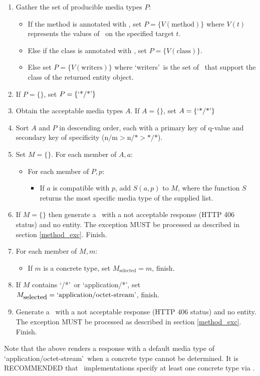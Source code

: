 \begin{enumerate}
\item Gather the set of producible media types $P$:
\begin{itemize}
\item If the method is annotated with \Produces, set $P = \{ V(\mbox{method}) \}$ where $V(t)$ represents the values of \Produces\ on the specified target $t$.
\item Else if the class is annotated with \Produces, set $P = \{ V(\mbox{class}) \}$.
\item Else set $P = \{ V(\mbox{writers}) \}$ where \lq writers\rq\ is the set of \MsgWrite\ that support the class of the returned entity object.
\end{itemize}

\item If $P = \{\}$, set $P = \{\mbox{\lq*/*\rq}\}$

\item Obtain the acceptable media types $A$. If $A = \{\}$, set $A = \{\mbox{\lq*/*\rq}\}$

\item Sort $A$ and $P$ in descending order, each with a primary key of q-value and secondary key of specificity ($\mbox{n/m} > \mbox{n/*} > \mbox{*/*}$).

\item Set $M=\{\}$. For each member of $A, a$:
\begin{itemize}
\item For each member of $P, p$:
\begin{itemize}
\item If $a$ is compatible with $p$, add $S(a,p)$ to $M$, where the function $S$ returns the most specific media type of the supplied list.
\end{itemize}
\end{itemize}

\item If $M = \{\}$ then generate a \WebAppExc\ with a not acceptable response (HTTP 406 status) and no entity. The exception MUST be processed as described in section \ref{method_exc}. Finish.

\item For each member of $M, m$:
\begin{itemize}
\item If $m$ is a concrete type, set $M_{\mbox{selected}} = m$, finish.
\end{itemize}

\item If $M$ contains \lq*/*\rq\ or \lq application/*\rq, set $M_{\mbox{selected}} = \mbox{\lq application/octet-stream\rq}$, finish.

\item Generate a \WebAppExc\ with a not acceptable response (HTTP 406 status) and no entity. The exception MUST be processed as described in section \ref{method_exc}. Finish.
\end{enumerate}

Note that the above renders a response with a default media type of \lq application/octet-stream\rq\ when a concrete type cannot be determined. It is RECOMMENDED that \MsgWrite\ implementations specify at least one concrete type via \Produces.